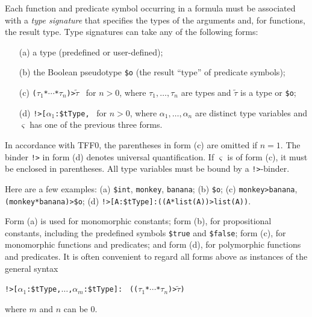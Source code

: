Each function and predicate symbol occurring in a formula must be associated
with a {\em type signature\/} that specifies the types of the arguments and, for
functions, the result type. Type signatures can take any of the following forms:
%
\begin{enumerate}
\item[(a)] a type (predefined or user-defined);
\item[(b)] the Boolean pseudotype {\tt \$o} (the result ``type'' of predicate symbols);
\item[(c)] {\tt ($\tau_1$\;*\;${\cdots}$\;*\;$\tau_n$)\;>\;$\tilde \tau$}
\ for $n > 0$, where $\tau_1,\dots,\tau_n$ are types and $\tilde \tau$ is
a type or {\tt \$o};
\item[(d)] {\tt !>[$\alpha_1$\;:\;\$tType,}\;{\tt ${\dots}$,}\;{\tt
$\alpha_n$\;:\;\$tType]:\;$\varsigma$}
\ for $n > 0$, where $\alpha_1,\dots,\alpha_n$ are distinct
type variables and $\varsigma$ has one of the previous three forms.
\end{enumerate}
%
In accordance with TFF0, the parentheses in form (c) are omitted if $n = 1$.
The binder {\tt !>} in form (d) denotes universal quantification.
If $\varsigma$ is of form (c), it must be enclosed in parentheses.
All type variables must be bound by a {\tt !>}-binder.

Here are a few examples:\enskip
(a) {\tt \$int}, {\tt monkey}, {\tt banana};\enskip
(b) {\tt \$o};\enskip
(c) {\tt monkey\;>\allowbreak\;banana},
    {\tt (monkey\;*\;banana)\;>\;\$o};\enskip
(d) {\tt !>[A\;:\;\$tType]:\;((A\;*\;list(A))\;>\;list(A))}.

Form (a) is used for monomorphic constants; form (b), for
propositional constants, including the predefined symbols {\tt \$true} and
{\tt \$false}; form (c), for monomorphic functions and predicates;
and form (d), for polymorphic functions and predicates. It is often
convenient to regard all forms above as instances of the general syntax
\begin{center}
{\tt !>[$\alpha_1$\;:\;\$tType,\;${\dots}$,\;$\alpha_m$\;:\;\$tType]:} {\tt
(($\tau_1$\;*\;${\cdots}$\;*\;$\tau_n$)\;>\;$\tilde \tau$)}
\end{center}
where $m$ and $n$ can be 0. %


